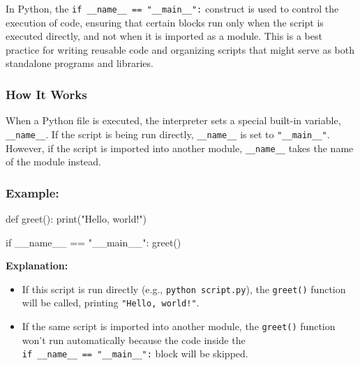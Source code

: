 \documentclass[
  letterpaper,
  DIV=11,
  numbers=noendperiod]{scrreprt}
\newenvironment{Shaded}{\begin{snugshade}}{\end{snugshade}}
\newcommand{\BuiltInTok}[1]{\textcolor[rgb]{0.00,0.23,0.31}{#1}}
\newcommand{\ControlFlowTok}[1]{\textcolor[rgb]{0.00,0.23,0.31}{#1}}
\newcommand{\KeywordTok}[1]{\textcolor[rgb]{0.00,0.23,0.31}{#1}}
\newcommand{\NormalTok}[1]{\textcolor[rgb]{0.00,0.23,0.31}{#1}}
\newcommand{\OperatorTok}[1]{\textcolor[rgb]{0.37,0.37,0.37}{#1}}
\newcommand{\StringTok}[1]{\textcolor[rgb]{0.13,0.47,0.30}{#1}}
\newcommand{\VariableTok}[1]{\textcolor[rgb]{0.07,0.07,0.07}{#1}}
\providecommand{\tightlist}{%
  \setlength{\itemsep}{0pt}\setlength{\parskip}{0pt}}\usepackage{longtable,booktabs,array}
\begin{document}
\begin{tcolorbox}[enhanced jigsaw, coltitle=black, colback=white, bottomrule=.15mm, arc=.35mm, titlerule=0mm, opacitybacktitle=0.6, toptitle=1mm, left=2mm, toprule=.15mm, opacityback=0, bottomtitle=1mm, title=\textcolor{quarto-callout-note-color}{\faInfo}\hspace{0.5em}{The Purpose of \texttt{if\ \_\_name\_\_\ ==\ "\_\_main\_\_":}}, rightrule=.15mm, colframe=quarto-callout-note-color-frame, breakable, colbacktitle=quarto-callout-note-color!10!white, leftrule=.75mm]

In Python, the \texttt{if\ \_\_name\_\_\ ==\ "\_\_main\_\_":} construct
is used to control the execution of code, ensuring that certain blocks
run only when the script is executed directly, and not when it is
imported as a module. This is a best practice for writing reusable code
and organizing scripts that might serve as both standalone programs and
libraries.

\hypertarget{how-it-works}{%
\subsubsection{How It Works}\label{how-it-works}}

When a Python file is executed, the interpreter sets a special built-in
variable, \texttt{\_\_name\_\_}. If the script is being run directly,
\texttt{\_\_name\_\_} is set to \texttt{"\_\_main\_\_"}. However, if the
script is imported into another module, \texttt{\_\_name\_\_} takes the
name of the module instead.

\hypertarget{example}{%
\subsubsection{Example:}\label{example}}

\begin{Shaded}
\begin{Highlighting}[]
\KeywordTok{def}\NormalTok{ greet():}
    \BuiltInTok{print}\NormalTok{(}\StringTok{"Hello, world!"}\NormalTok{)}

\ControlFlowTok{if} \VariableTok{\_\_name\_\_} \OperatorTok{==} \StringTok{"\_\_main\_\_"}\NormalTok{:}
\NormalTok{    greet()}
\end{Highlighting}
\end{Shaded}

\textbf{Explanation:}

\begin{itemize}
\tightlist
\item
  If this script is run directly (e.g., \texttt{python\ script.py}), the
  \texttt{greet()} function will be called, printing
  \texttt{"Hello,\ world!"}.
\item
  If the same script is imported into another module, the
  \texttt{greet()} function won't run automatically because the code
  inside the \texttt{if\ \_\_name\_\_\ ==\ "\_\_main\_\_":} block will
  be skipped.
\end{itemize}


\end{tcolorbox}
\end{document}

